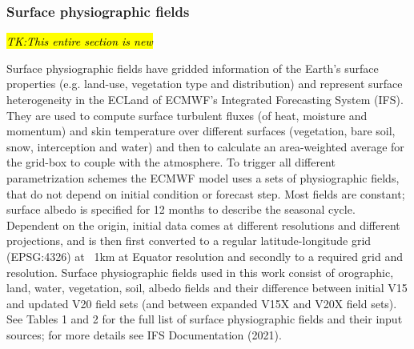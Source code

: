 \documentclass[hess, manuscript]{copernicus}
\begin{document}
\subsubsection{Surface physiographic fields}
\hl{\textit{TK:This entire section is new}}

\noindent Surface physiographic fields have gridded information of the Earth’s surface properties (e.g. land-use, vegetation type and distribution) and represent surface heterogeneity in the ECLand of ECMWF’s Integrated Forecasting System (IFS). They are used to compute surface turbulent fluxes (of heat, moisture and momentum) and skin temperature over different surfaces (vegetation, bare soil, snow, interception and water) and then to calculate an area-weighted average for the grid-box to couple with the atmosphere. To trigger all different parametrization schemes the ECMWF model uses a sets of physiographic fields, that do not depend on initial condition or forecast step. Most fields are constant; surface albedo is specified for 12 months to describe the seasonal cycle. Dependent on the origin, initial data comes at different resolutions and different projections, and is then first converted to a regular latitude-longitude grid (EPSG:4326) at ~1km at Equator resolution and secondly to a required grid and resolution. Surface physiographic fields used in this work consist of orographic, land, water, vegetation, soil, albedo fields and their difference between initial V15 and updated V20 field sets (and between expanded V15X and V20X field sets). See Tables 1 and 2 for the full list of surface physiographic fields and their input sources; for more details see IFS Documentation (2021).
\end{document}

